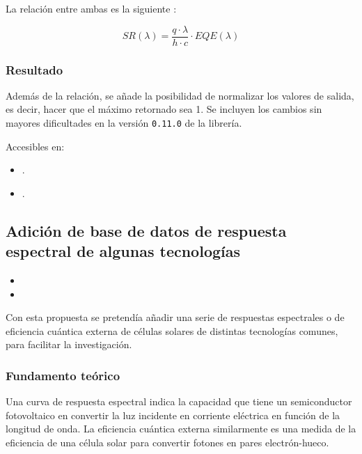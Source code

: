 La relación entre ambas es la siguiente \cite[pp. 15-16, Eq. ]{Markvart2012-un}:

\begin{equation}
    SR(\lambda) = \frac{q \cdot \lambda}{h \cdot c} \cdot EQE(\lambda)
\end{equation}

\subsubsection{Resultado}

Además de la relación, se añade la posibilidad de normalizar los valores de salida, es decir, hacer que el máximo retornado sea 1. Se incluyen los cambios sin mayores dificultades en la versión \texttt{0.11.0} de la librería.

Accesibles en:

\begin{itemize}
    \item {}.
    \item {}.
\end{itemize}

\subsection{Adición de base de datos de respuesta espectral de algunas tecnologías}

\begin{itemize}
    \item {}
    \item {}
\end{itemize}

Con esta propuesta se pretendía añadir una serie de respuestas espectrales o de eficiencia cuántica externa de células solares de distintas tecnologías comunes, para facilitar la investigación.

\subsubsection{Fundamento teórico}

Una curva de respuesta espectral indica la capacidad que tiene un semiconductor fotovoltaico en convertir la luz incidente en corriente eléctrica en función de la longitud de onda. La eficiencia cuántica externa similarmente es una medida de la eficiencia de una célula solar para convertir fotones en pares electrón-hueco.

